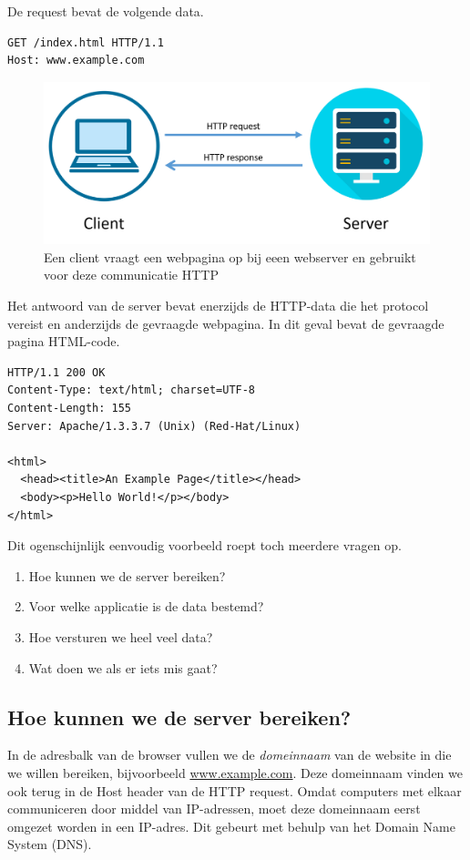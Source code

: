 De request bevat de volgende data.
\begin{verbatim}
GET /index.html HTTP/1.1
Host: www.example.com
\end{verbatim}

\begin{figure}
   \centering
   \includegraphics[width=.65\textwidth]{images/http-request.png}
   \caption{Een client vraagt een webpagina op bij eeen webserver en gebruikt voor deze communicatie HTTP}
   \label{fig:client-server}
\end{figure}

Het antwoord van de server bevat enerzijds de HTTP-data die het protocol vereist en anderzijds de gevraagde webpagina.
In dit geval bevat de gevraagde pagina HTML-code.
\begin{verbatim}
HTTP/1.1 200 OK
Content-Type: text/html; charset=UTF-8
Content-Length: 155
Server: Apache/1.3.3.7 (Unix) (Red-Hat/Linux)

<html>
  <head><title>An Example Page</title></head>
  <body><p>Hello World!</p></body>
</html>
\end{verbatim}

Dit ogenschijnlijk eenvoudig voorbeeld roept toch meerdere vragen op.
\begin{enumerate}
\item Hoe kunnen we de server bereiken?
\item Voor welke applicatie is de data bestemd?
\item Hoe versturen we heel veel data?
\item Wat doen we als er iets mis gaat?
\end{enumerate}



\subsection{Hoe kunnen we de server bereiken?}
In de adresbalk van de browser vullen we de \emph{domeinnaam} van de website in die we willen bereiken, bijvoorbeeld \url{www.example.com}.
Deze domeinnaam vinden we ook terug in de Host header van de HTTP request.
Omdat computers met elkaar communiceren door middel van IP-adressen, moet deze domeinnaam eerst omgezet worden in een IP-adres.
Dit gebeurt met behulp van het Domain Name System (DNS).

